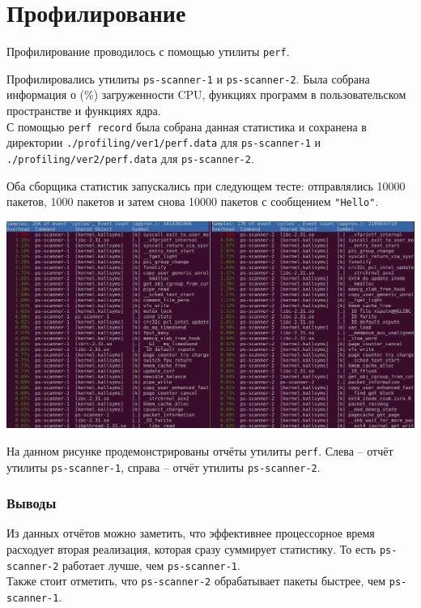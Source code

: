 \section{Профилирование}

Профилирование проводилось с помощью утилиты \verb|perf|.

\linespace

Профилировались утилиты \verb|ps-scanner-1| и \verb|ps-scanner-2|. Была собрана информация о (\%) загруженности CPU, функциях программ в пользовательском пространстве и функциях ядра.\\
С помощью \verb|perf record| была собрана данная статистика и сохранена в директории \verb|./profiling/ver1/perf.data| для \verb|ps-scanner-1| и \verb|./profiling/ver2/perf.data| для \verb|ps-scanner-2|.

\linespace

Оба сборщика статистик запускались при следующем тесте: отправлялись 10000 пакетов, 1000 пакетов и затем снова 10000 пакетов с сообщением \verb|"Hello"|.

\vspace{-0.8cm}
\begin{center}
    \includegraphics[scale=0.28]{../assets/perf.png}
\end{center}
\vspace{-0.5cm}

На данном рисунке продемонстрированы отчёты утилиты \verb|perf|. Слева -- отчёт утилиты \verb|ps-scanner-1|, справа -- отчёт утилиты \verb|ps-scanner-2|.

\newpage

\subsubsection*{Выводы}

Из данных отчётов можно заметить, что эффективнее процессорное время расходует вторая реализация, которая сразу суммирует статистику. То есть \verb|ps-scanner-2| работает лучше, чем \verb|ps-scanner-1|.\\
Также стоит отметить, что \verb|ps-scanner-2| обрабатывает пакеты быстрее, чем \verb|ps-scanner-1|.
